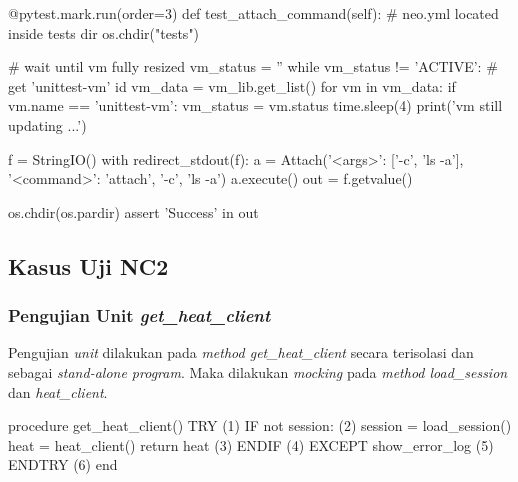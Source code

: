\begin{code}
\begin{ignasicblock}[title=test\_attach\_command,minted language=Python]
@pytest.mark.run(order=3)
def test_attach_command(self):
    # neo.yml located inside tests dir
    os.chdir("tests")

    # wait until vm fully resized
    vm_status = ''
    while vm_status != 'ACTIVE':
        # get 'unittest-vm' id
        vm_data = vm_lib.get_list()
        for vm in vm_data:
            if vm.name == 'unittest-vm':
                vm_status = vm.status
                time.sleep(4)
                print('vm still updating ...')

    f = StringIO()
    with redirect_stdout(f):
        a = Attach({'<args>': ['-c', 'ls -a'],
                    '<command>': 'attach'}, '-c', 'ls -a')
        a.execute()
        out = f.getvalue()

    os.chdir(os.pardir)
    assert 'Success' in out
\end{ignasicblock}
\label{ts:attach-c}
\end{code}

\subsection{Kasus Uji NC2}

\subsubsection{Pengujian Unit \emph{get\_heat\_client}}

\noindent
Pengujian \emph{unit} dilakukan pada \emph{method get\_heat\_client}
secara terisolasi dan sebagai \emph{stand-alone program}. Maka
dilakukan \emph{mocking} pada \emph{method load\_session} dan
\emph{heat\_client}.

\begin{code}
\begin{ignasicblock}[title=get\_heat\_client,minted language=text]
procedure get_heat_client()
    TRY                                 (1)
        IF not session:                 (2)
            session = load_session()
            heat = heat_client()
            return heat                 (3)
        ENDIF                           (4)
    EXCEPT
       show_error_log                   (5)
    ENDTRY                              (6)
end
\end{ignasicblock}
\label{pc:get_heat_client}
\end{code}


